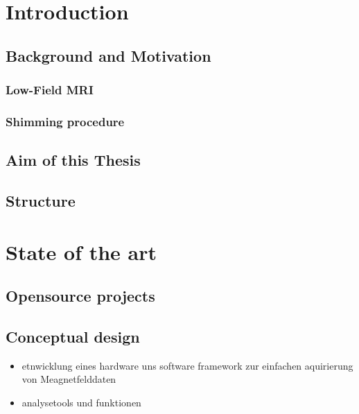 \hypertarget{introduction}{%
\chapter{Introduction}\label{introduction}}

\hypertarget{background-and-motivation}{%
\section{Background and Motivation}\label{background-and-motivation}}

\hypertarget{low-field-mri}{%
\subsection{Low-Field MRI}\label{low-field-mri}}

\hypertarget{shimming-procedure}{%
\subsection{Shimming procedure}\label{shimming-procedure}}

\hypertarget{aim-of-this-thesis}{%
\section{Aim of this Thesis}\label{aim-of-this-thesis}}

\hypertarget{structure}{%
\section{Structure}\label{structure}}

\hypertarget{state-of-the-art}{%
\chapter{State of the art}\label{state-of-the-art}}

\hypertarget{opensource-projects}{%
\section{Opensource projects}\label{opensource-projects}}

\hypertarget{conceptual-design}{%
\section{Conceptual design}\label{conceptual-design}}

\begin{itemize}
\tightlist
\item
  etnwicklung eines hardware uns software framework zur einfachen
  aquirierung von Meagnetfelddaten
\item
  analysetools und funktionen
\end{itemize}

